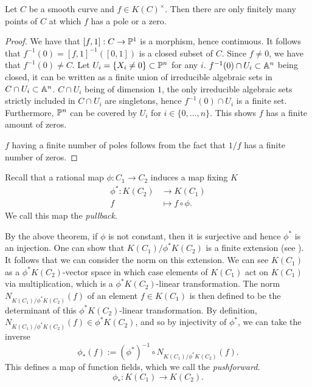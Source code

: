 \begin{proposition}
	\label{prop:zero-finiteness}
	Let $C$ be a smooth curve and $f \in K(C)^\times$.
	Then there are only finitely 
	many points of $C$ at which $f$ has a pole or a zero.
\end{proposition}

\begin{proof}
	We have that $[f, 1]: C \to \mathbb{P}^1$ is a morphism, hence continuous.
	It follows that $f^{-1}(0) = [f, 1]^{-1}([0, 1])$ is a closed subset
	of $C$. Since $f \neq 0$, we have that $f^{-1}(0) \neq C$.
	Let $U_i = \{X_i \neq 0\} \subset \mathbb{P}^n$ for any $i$.
	$f^{-1}(0)\cap U_i \subset \mathbb{A}^n$ being closed,
	it can be written as a finite union of irreducible
	algebraic sets in $C\cap U_i \subset \mathbb{A}^n$.
	$C\cap U_i$ being of dimension $1$, the only irreducible algebraic
	sets strictly included in $C \cap U_i$ are singletons,
	hence $f^{-1}(0)\cap U_i$ is a finite set.
	Furthermore, $\mathbb{P}^n$ can be covered by $U_i$ for $i \in \{0, \dots, n\}$.
	This shows $f$ has a finite amount of zeros.

	$f$ having a finite number of poles follows from the
	fact that $1/f$ has a finite number of zeros.
\end{proof}


Recall that a rational map $\phi: C_1 \to C_2$ induces a map fixing $K$
\begin{align*}
	\phi^*: K(C_2) &\to K(C_1)\\
	f &\mapsto f\circ\phi.
\end{align*}
We call this map the \emph{pullback}.

By the above theorem, if $\phi$ is not constant, then it is surjective
and hence $\phi^*$ is an injection.
One can show that $K(C_1) / \phi^*K(C_2)$ is a finite extension 
(see \cite[II.6.8]{hartshorne}).
It follows that we can consider the norm on this extension.
We can see $K(C_1)$ as a
$\phi^*K(C_2)$-vector space in which case elements of $K(C_1)$ act on
$K(C_1)$ via multiplication, which is a $\phi^*K(C_2)$-linear
transformation. The norm $N_{K(C_1)/\phi^*K(C_2)}(f)$ of an element
$f \in K(C_1)$ is then defined to be
the determinant of this $\phi^*K(C_2)$-linear transformation.
By definition, $N_{K(C_1)/\phi^*K(C_2)}(f) \in \phi^*K(C_2)$, and so by
injectivity of $\phi^*$, we can take the inverse
\begin{equation*}
	\phi_*(f) := (\phi^*)^{-1}\circ N_{K(C_1)/\phi^* K(C_2)}(f).
\end{equation*}
This defines a map of function fields, which we call the \emph{pushforward}.
\begin{equation*}
	\phi_*: K(C_1) \to K(C_2).
\end{equation*}


